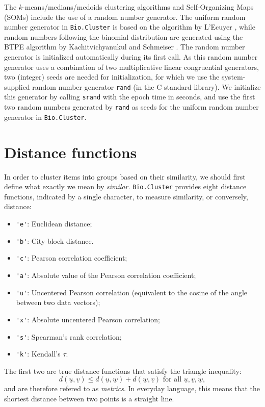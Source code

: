 \documentclass{report}
\begin{document}
The $k$-means/medians/medoids clustering algorithms and Self-Organizing Maps (SOMs) include the use of a random number generator. The uniform random number generator in \verb|Bio.Cluster| is based on the algorithm by L'Ecuyer \cite{lecuyer1988}, while random numbers following the binomial distribution are generated using the BTPE algorithm by Kachitvichyanukul and Schmeiser \cite{kachitvichyanukul1988}. The random number generator is initialized automatically during its first call. As this random number generator uses a combination of two multiplicative linear congruential generators, two (integer) seeds are needed for initialization, for which we use the system-supplied random number generator \verb|rand| (in the C standard library). We initialize this generator by calling \verb|srand| with the epoch time in seconds, and use the first two random numbers generated by \verb|rand| as seeds for the uniform random number generator in \verb|Bio.Cluster|.

\section{Distance functions}
\label{sec:distancefunctions}

In order to cluster items into groups based on their similarity, we should first define what exactly we mean by \emph{similar}. \verb|Bio.Cluster| provides eight distance functions, indicated by a single character, to measure similarity, or conversely, distance:
\begin{itemize}
\item \verb|'e'|:
Euclidean distance;
\item \verb|'b'|:
City-block distance.
\item \verb|'c'|:
Pearson correlation coefficient;
\item \verb|'a'|:
Absolute value of the Pearson correlation coefficient;
\item \verb|'u'|:
Uncentered Pearson correlation (equivalent to the cosine of the angle between two data vectors);
\item \verb|'x'|:
Absolute uncentered Pearson correlation;
\item \verb|'s'|:
Spearman's rank correlation;
\item \verb|'k'|:
Kendall's $\tau$.
\end{itemize}
The first two are true distance functions that satisfy the triangle inequality:
$$d\left(\underline{u},\underline{v}\right) \leq d\left(\underline{u},\underline{w}\right) + d\left(\underline{w},\underline{v}\right) \textrm{ for all } \underline{u}, \underline{v}, \underline{w},$$
and are therefore refered to as \emph{metrics}. In everyday language, this means that the shortest distance between two points is a straight line.
\end{document}
